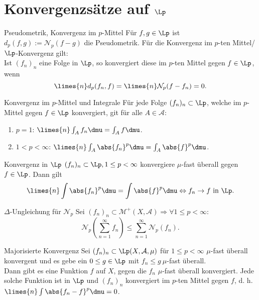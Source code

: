 \section*{Konvergenzsätze auf \( \Lp \)}

\begin{karte}{Pseudometrik, Konvergenz im \(p\)-Mittel}
    Für \( f,g\in \Lp \) ist 
    \( d_p (f,g) := \mathcal{N}_p(f - g) \)
    die Pseudometrik. Für die Konvergenz im 
    \(p\)-ten Mittel/\(\Lp\)-Konvergenz gilt:\\
    Ist \( (f_n)_n \) eine Folge in \( \Lp \), 
    so konvergiert diese im \( p \)-ten Mittel gegen 
    \( f \in \Lp \), wenn 
    \[ \limes{n} d_p(f_n, f) = \limes{n} \mathcal{N}_p(f - f_n) = 0. \]
\end{karte}

\begin{karte}{Konvergenz im \(p\)-Mittel und Integrale}
    Für jede Folge \( (f_n)_n \subset \Lp \), welche 
    im \( p \)-Mittel gegen \( f\in \Lp \) konvergiert, 
    git für alle \( A \in \mathcal{A} \):
    \begin{enumerate}
        \item \( p = 1 \): \( \limes{n} \int_A f_n \dmu = \int_A f \dmu \).
        \item \( 1<p<\infty \): \( \limes{n} \int_A \abs{f_n}^p \dmu = \int_A \abs{f}^p \dmu \).
    \end{enumerate}
\end{karte}

\begin{karte}{Konvergenz in \( \Lp \)}
    \( (f_n)_n\subset \Lp, 1 \leq p < \infty \) 
    konvergiere \( \mu \)-fast überall gegen \( f\in\Lp \). 
    Dann gilt 
    \[ \limes{n} \int \abs{f_n}^p \dmu = \int \abs{f}^p \dmu 
    \Leftrightarrow f_n \rightarrow f \text{ in }\Lp. \]
\end{karte}

\begin{karte}{\( \Delta \)-Ungleichung für \( \mathcal{N}_p \)}
    Sei \( (f_n)_n \subset \mathcal{M}^+(X, \mathcal{A})
    \Rightarrow \forall 1 \leq p < \infty: \)
    \[ \mathcal{N}_p(\sum_{n=1}^\infty f_n) \leq \sum_{n=1}^\infty \mathcal{N}_p(f_n). \]
\end{karte}

\begin{karte}{Majorisierte Konvergenz}
    Sei \( (f_n)_n \subset \Lp(X, \mathcal{A}, \mu) \) 
    für \( 1 \leq p < \infty \) \( \mu \)-fast überall konvergent 
    und es gebe ein \( 0 \leq g \in \Lp \) mit 
    \( f_n \leq g \ \mu \)-fast überall.\\
    Dann gibt es eine Funktion \( f \) auf \(X\), 
    gegen die \(f_n\) \( \mu \)-fast überall konvergiert. 
    Jede solche Funktion ist in \( \Lp \) und 
    \( (f_n)_n \) konvergiert im \(p\)-ten Mittel gegen \(f\), 
    d. h. \( \limes{n} \int \abs{f_n - f}^p \dmu = 0 \).
\end{karte}

